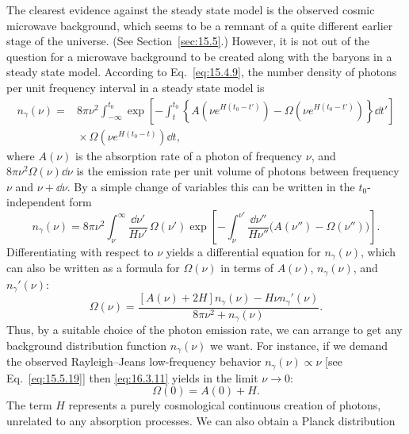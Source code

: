 The clearest evidence against the steady state model is the observed cosmic
microwave background, which seems to be a remnant of a quite different earlier
stage of the universe. (See Section~\ref{sec:15.5}.) However, it is not out of
the question for a microwave background to be created along with the baryons
in a steady state model. According to Eq.~\eqref{eq:15.4.9}, the number density
of photons per unit frequency interval in a steady state model is
\[
  \begin{split}
  n_\gamma(\nu)
  ={}&
  8\pi\nu^2
  \int_{-\infty}^{t_0}
  \exp\!\left[
    -\int_t^{t_0}
    \left\{
      A\!\left(\nu e^{H(t_0-t')}\right)
      -\Omega\!\left(\nu e^{H(t_0-t')}\right)
    \right\}\dd t'
  \right]
  \\
  &{}\times
  \Omega\!\left(\nu e^{H(t_0-t)}\right)\dd t ,
  \end{split}
\]
where \(A(\nu)\) is the absorption rate of a photon of frequency \(\nu\), and
\(8\pi\nu^2\Omega(\nu)\dd\nu\) is the emission rate per unit volume of photons
between frequency \(\nu\) and \(\nu+\dd\nu\). By a simple change of variables
this can be written in the \(t_0\)-independent form
\begin{equation}
  n_\gamma(\nu)
  =
  8\pi\nu^2
  \int_\nu^\infty
  \frac{\dd\nu'}{H\nu'}\,
  \Omega(\nu')
  \exp\!\left[
    -\int_\nu^{\nu'}
    \frac{\dd\nu''}{H\nu''}
    \bigl(A(\nu'')-\Omega(\nu'')\bigr)
  \right].
  \tag{16.3.10}\label{eq:16.3.10}
\end{equation}
Differentiating with respect to \(\nu\) yields a differential equation for
\(n_\gamma(\nu)\), which can also be written as a formula for \(\Omega(\nu)\)
in terms of \(A(\nu)\), \(n_\gamma(\nu)\), and \(n_\gamma'(\nu)\):
\begin{equation}
  \Omega(\nu)
  =
  \frac{
    [A(\nu)+2H]n_\gamma(\nu)-H\nu n_\gamma'(\nu)
  }{
    8\pi\nu^2+n_\gamma(\nu)
  }.
  \tag{16.3.11}\label{eq:16.3.11}
\end{equation}
Thus, by a suitable choice of the photon emission rate, we can arrange to get
any background distribution function \(n_\gamma(\nu)\) we want. For instance,
if we demand the observed Rayleigh--Jeans low-frequency behavior
\(n_\gamma(\nu)\propto\nu\) [see Eq.~\eqref{eq:15.5.19}] then
\eqref{eq:16.3.11} yields in the limit \(\nu\to0\):
\begin{equation}
  \Omega(0)=A(0)+H.
  \tag{16.3.12}\label{eq:16.3.12}
\end{equation}
The term \(H\) represents a purely cosmological continuous creation of photons,
unrelated to any absorption processes. We can also obtain a Planck distribution

